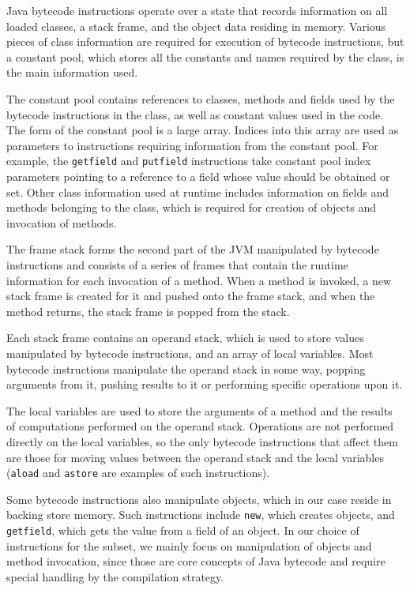 Java bytecode instructions operate over a state that records
information on all loaded classes, a stack frame, and the object data
residing in memory.
Various pieces of class information are required for execution of
bytecode instructions, but a constant pool, which stores all the
constants and names required by the class, is the main information
used.

The constant pool contains references to classes, methods and fields
used by the bytecode instructions in the class, as well as constant
values used in the code.
The form of the constant pool is a large array.
Indices into this array are used as parameters to instructions
requiring information from the constant pool.
For example, the \texttt{getfield} and \texttt{putfield} instructions
take constant pool index parameters pointing to a reference to a field
whose value should be obtained or set.
Other class information used at runtime includes information on fields
and methods belonging to the class, which is required for creation of
objects and invocation of methods.

The frame stack forms the second part of the JVM manipulated by
bytecode instructions and consists of a series of frames that contain
the runtime information for each invocation of a method.
When a method is invoked, a new stack frame is created for it and
pushed onto the frame stack, and when the method returns, the stack
frame is popped from the stack.

Each stack frame contains an operand stack, which is used to store
values manipulated by bytecode instructions, and an array of local
variables.
Most bytecode instructions manipulate the operand stack in some way,
popping arguments from it, pushing results to it or performing
specific operations upon it.

The local variables are used to store the arguments of a method and
the results of computations performed on the operand stack.
Operations are not performed directly on the local variables, so the
only bytecode instructions that affect them are those for moving
values between the operand stack and the local variables
(\texttt{aload} and \texttt{astore} are examples of such
instructions).

Some bytecode instructions also manipulate objects, which in our case
reside in backing store memory.
Such instructions include \texttt{new}, which creates objects, and
\texttt{getfield}, which gets the value from a field of an object.
In our choice of instructions for the subset, we mainly focus on
manipulation of objects and method invocation, since those are core
concepts of Java bytecode and require special handling by the
compilation strategy.


